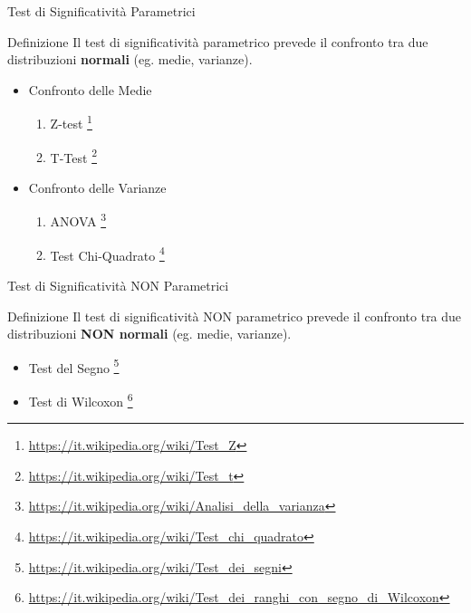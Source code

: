 \documentclass[10pt]{beamer}
\begin{document}
	\begin{frame}{Test di Significatività Parametrici}

		\begin{alertblock}{Definizione}
			Il test di significatività parametrico prevede il confronto tra due distribuzioni \alert{\textbf{normali}} (eg. medie, varianze). 
		\end{alertblock}

		\begin{itemize}
			\item Confronto delle Medie
			\begin{enumerate}
				\item Z-test \footnote{\tiny{\url{https://it.wikipedia.org/wiki/Test_Z}}}
				\item T-Test \footnote{\tiny{\url{https://it.wikipedia.org/wiki/Test_t}}}
			\end{enumerate}
			\item Confronto delle Varianze
			\begin{enumerate}
				\item ANOVA \footnote{\tiny{\url{https://it.wikipedia.org/wiki/Analisi_della_varianza}}}
				\item Test Chi-Quadrato \footnote{\tiny{\url{https://it.wikipedia.org/wiki/Test_chi_quadrato}}}
			\end{enumerate}
		\end{itemize}

	\end{frame}

	\begin{frame}{Test di Significatività NON Parametrici}

		\begin{alertblock}{Definizione}
			Il test di significatività NON parametrico prevede il confronto tra due distribuzioni \alert{\textbf{NON normali}} (eg. medie, varianze). 
		\end{alertblock}

		\begin{itemize}
			\item Test del Segno \footnote{\tiny{\url{https://it.wikipedia.org/wiki/Test_dei_segni}}}
			\item Test di Wilcoxon \footnote{\tiny{\url{https://it.wikipedia.org/wiki/Test_dei_ranghi_con_segno_di_Wilcoxon}}}
		\end{itemize}

	\end{frame}
\end{document}
